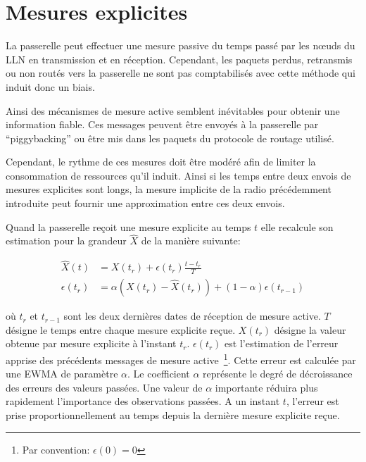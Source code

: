 \section{Mesures explicites}
\label{supervision:explicite}

La passerelle peut effectuer une mesure passive du temps passé par les nœuds du \ac{LLN} en transmission et en réception.
Cependant, les paquets perdus, retransmis ou non routés vers la passerelle ne sont pas comptabilisés avec cette méthode qui induit donc un biais.

Ainsi des mécanismes de mesure active semblent inévitables pour obtenir une information fiable.
Ces messages peuvent être envoyés à la passerelle par ``piggybacking'' ou être mis dans les paquets du protocole de routage utilisé.

Cependant, le rythme de ces mesures doit être modéré afin de limiter la consommation de ressources qu'il induit.
Ainsi si les temps entre deux envois de mesures explicites sont longs, la mesure implicite de la radio précédemment introduite peut fournir une approximation entre ces deux envois.

Quand la passerelle reçoit une mesure explicite au temps $t$ elle recalcule son estimation pour la grandeur $\widehat{X}$ de la manière suivante:

\begin{align}
  \widehat{X}(t) &= X(t_r) + \epsilon(t_r)\frac{t - t_r}{T}\\
  \epsilon(t_r) &= \alpha (X(t_r) - \widehat{X}(t_r)) + (1 - \alpha)\epsilon(t_{r-1})
  \label{supervision:eqn:bias}
\end{align}

où $t_r$ et $t_{r-1}$ sont les deux dernières dates de réception de mesure active.
$T$ désigne le temps entre chaque mesure explicite reçue.
$X(t_r)$ désigne la valeur obtenue par mesure explicite à l'instant $t_r$.
$\epsilon(t_r)$ est l’estimation de l'erreur apprise des précédents messages de mesure active~\footnote{Par convention: $\epsilon(0) = 0$}.
Cette erreur est calculée par une \ac{EWMA} de paramètre $\alpha$.
Le coefficient $\alpha$ représente le degré de décroissance des erreurs des valeurs passées.
Une valeur de $\alpha$ importante réduira plus rapidement l'importance des observations passées.
A un instant $t$, l'erreur est prise proportionnellement au temps depuis la dernière mesure explicite reçue.



